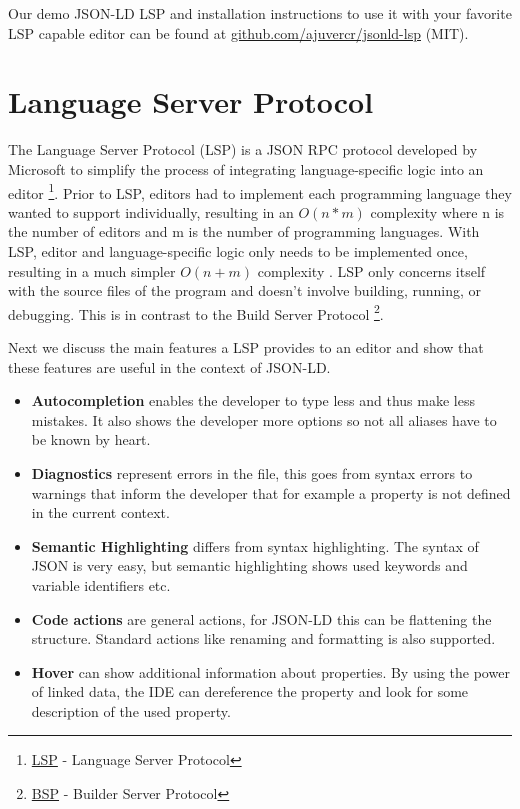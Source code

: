 \documentclass[
]{ceurart}
\begin{document}
Our demo JSON-LD LSP and installation instructions to use it with your favorite LSP capable editor can be found at \href{github.com/ajuvercr/jsonld-lsp](https://github.com/ajuvercr/jsonld-lsp}{github.com/ajuvercr/jsonld-lsp} (MIT).


\section{Language Server Protocol}

The Language Server Protocol (LSP) is a JSON RPC protocol developed by Microsoft to simplify the process of integrating language-specific logic into an editor \footnote{\href{https://microsoft.github.io/language-server-protocol/}{LSP} - Language Server Protocol}. 
Prior to LSP, editors had to implement each programming language they wanted to support individually, resulting in an \(O(n*m)\) complexity where n is the number of editors and m is the number of programming languages.
With LSP, editor and language-specific logic only needs to be implemented once, resulting in a much simpler \(O(n+m)\) complexity \cite{LSP-Multi}.
LSP only concerns itself with the source files of the program and doesn't involve building, running, or debugging.
This is in contrast to the Build Server Protocol \footnote{\href{https://github.com/build-server-protocol/build-server-protocol}{BSP} - Builder Server Protocol}.

Next we discuss the main features a LSP provides to an editor and show that these features are useful in the context of JSON-LD.

\begin{itemize}
  \item \textbf{Autocompletion} enables the developer to type less and thus make less mistakes. It also shows the developer more options so not all aliases have to be known by heart.
  \item \textbf{Diagnostics} represent errors in the file, this goes from syntax errors to warnings that inform the developer that for example a property is not defined in the current context.
  \item \textbf{Semantic Highlighting} differs from syntax highlighting. The syntax of JSON is very easy, but semantic highlighting shows used keywords and variable identifiers etc.
  \item \textbf{Code actions} are general actions, for JSON-LD this can be flattening the structure. Standard actions like renaming and formatting is also supported.
  \item \textbf{Hover} can show additional information about properties. By using the power of linked data, the IDE can dereference the property and look for some description of the used property.
\end{itemize}
\end{document}
